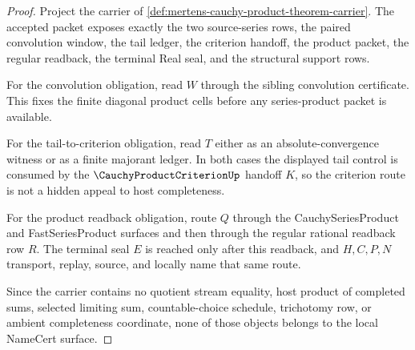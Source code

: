 \begin{proof}
Project the carrier of \autoref{def:mertens-cauchy-product-theorem-carrier}. The accepted packet exposes exactly the two source-series rows, the paired convolution window, the tail ledger, the criterion handoff, the product packet, the regular readback, the terminal Real seal, and the structural support rows.

For the convolution obligation, read $W$ through the sibling convolution certificate. This fixes the finite diagonal product cells before any series-product packet is available.

For the tail-to-criterion obligation, read $T$ either as an absolute-convergence witness or as a finite majorant ledger. In both cases the displayed tail control is consumed by the $\CauchyProductCriterionUp$ handoff $K$, so the criterion route is not a hidden appeal to host completeness.

For the product readback obligation, route $Q$ through the CauchySeriesProduct and FastSeriesProduct surfaces and then through the regular rational readback row $R$. The terminal seal $E$ is reached only after this readback, and $H,C,P,N$ transport, replay, source, and locally name that same route.

Since the carrier contains no quotient stream equality, host product of completed sums, selected limiting sum, countable-choice schedule, trichotomy row, or ambient completeness coordinate, none of those objects belongs to the local NameCert surface.
\end{proof}

